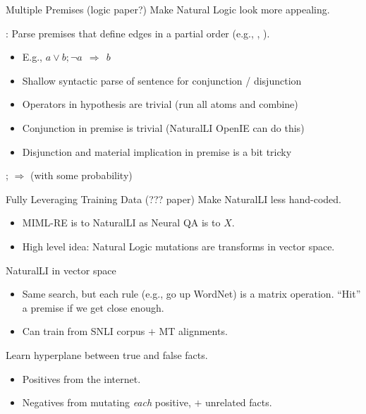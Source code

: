\begin{frame}{Multiple Premises (logic paper?)}
 Make Natural Logic look more appealing.
\vspace{1em}
\pause

:
  Parse premises that define edges in a partial order
   (e.g., , ).
\vspace{1em}
\pause

\begin{itemize}
  \item E.g., $a \lor b; \lnot a ~~\Rightarrow~~ b$
  \pause
  \item Shallow syntactic parse of sentence for conjunction / disjunction
  \pause
  \item Operators in hypothesis are trivial (run all atoms and combine)
  \item Conjunction in premise is trivial (NaturalLI OpenIE can do this)
  \item Disjunction and material implication in premise is a bit tricky
\end{itemize}
\vspace{1em}
\pause

  ;  $\Rightarrow$
   (with some probability)
\end{frame}


\begin{frame}{Fully Leveraging Training Data (??? paper)}
 Make NaturalLI less hand-coded.
\vspace{0.5em}
\pause

\begin{itemize}
  \item MIML-RE is to NaturalLI as Neural QA is to $X$.
  \item High level idea: Natural Logic mutations are transforms in
        vector space.
\end{itemize}
\vspace{0.5em}
\pause

 NaturalLI in vector space
\begin{itemize}
  \item Same search, but each rule (e.g., go up WordNet) is a matrix operation.
        ``Hit'' a premise if we get close enough.
  \item Can train from SNLI corpus $+$ MT alignments.
\end{itemize}
\vspace{0.5em}
\pause

 Learn hyperplane between true and false facts.
\begin{itemize}
  \item Positives from the internet.
  \item Negatives from mutating \textit{each} positive, $+$
        unrelated facts.
\end{itemize}

\end{frame}
